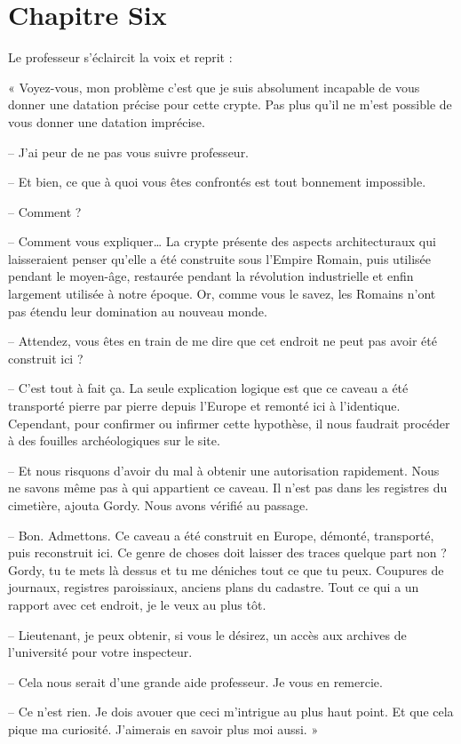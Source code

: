 \chapter[Chapitre Six]{Chapitre Six}
Le professeur s'éclaircit la voix et reprit :

« Voyez-vous, mon problème c'est que je suis absolument incapable de vous donner une datation précise pour cette crypte.
Pas plus qu'il ne m'est possible de vous donner une datation imprécise.

-- J'ai peur de ne pas vous suivre professeur.

-- Et bien, ce que à quoi vous êtes confrontés est tout bonnement impossible.

-- Comment ?

-- Comment vous expliquer\ldots{} La crypte présente des aspects architecturaux qui laisseraient penser qu'elle a été
construite sous l'Empire Romain, puis utilisée pendant le moyen-âge, restaurée pendant la révolution industrielle et
enfin largement utilisée à notre époque. Or, comme vous le savez, les Romains n'ont pas étendu leur domination au
nouveau monde.

-- Attendez, vous êtes en train de me dire que cet endroit ne peut pas avoir été construit ici ?

-- C'est tout à fait ça. La seule explication logique est que ce caveau a été transporté pierre par pierre depuis
l'Europe et remonté ici à l'identique. Cependant, pour confirmer ou infirmer cette hypothèse, il nous faudrait procéder
à des fouilles archéologiques sur le site.

-- Et nous risquons d'avoir du mal à obtenir une autorisation rapidement. Nous ne savons même pas à qui appartient ce
caveau. Il n'est pas dans les registres du cimetière, ajouta Gordy. Nous avons vérifié au passage.

-- Bon. Admettons. Ce caveau a été construit en Europe, démonté, transporté, puis reconstruit ici. Ce genre de choses
doit laisser des traces quelque part non ? Gordy, tu te mets là dessus et tu me déniches tout ce que tu peux. Coupures
de journaux, registres paroissiaux, anciens plans du cadastre. Tout ce qui a un rapport avec cet endroit, je le veux au
plus tôt.

-- Lieutenant, je peux obtenir, si vous le désirez, un accès aux archives de l'université pour votre inspecteur.

-- Cela nous serait d'une grande aide professeur. Je vous en remercie.

-- Ce n'est rien. Je dois avouer que ceci m'intrigue au plus haut point. Et que cela pique ma curiosité. J'aimerais en
savoir plus moi aussi. »

